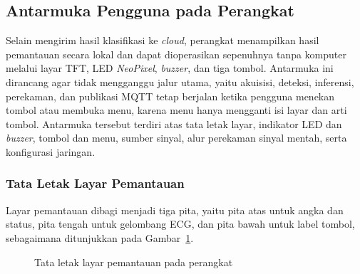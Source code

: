 \subsection{Antarmuka Pengguna pada Perangkat}

Selain mengirim hasil klasifikasi ke \textit{cloud}, perangkat menampilkan hasil pemantauan secara lokal dan dapat dioperasikan sepenuhnya tanpa komputer melalui layar TFT, LED \textit{NeoPixel}, \textit{buzzer}, dan tiga tombol. Antarmuka ini dirancang agar tidak mengganggu jalur utama, yaitu akuisisi, deteksi, inferensi, perekaman, dan publikasi MQTT tetap berjalan ketika pengguna menekan tombol atau membuka menu, karena menu hanya mengganti isi layar dan arti tombol. Antarmuka tersebut terdiri atas tata letak layar, indikator LED dan \textit{buzzer}, tombol dan menu, sumber sinyal, alur perekaman sinyal mentah, serta konfigurasi jaringan.

\subsubsection{Tata Letak Layar Pemantauan}

Layar pemantauan dibagi menjadi tiga pita, yaitu pita atas untuk angka dan status, pita tengah untuk gelombang ECG, dan pita bawah untuk label tombol, sebagaimana ditunjukkan pada Gambar~\ref{fig:3-tata-letak-layar}.

\begin{figure}[!ht]
  \centering
  \caption{Tata letak layar pemantauan pada perangkat}
  \label{fig:3-tata-letak-layar}
\end{figure}

